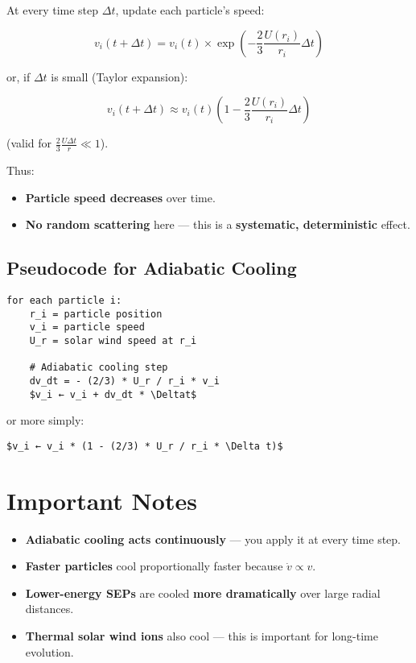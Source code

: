At every time step $\Delta t$, update each particle’s speed:

\begin{equation}
v_i(t + \Delta t) = v_i(t) \times \exp\left( -\frac{2}{3} \frac{U(r_i)}{r_i} \Delta t \right)
\tag{5}
\end{equation}

or, if $\Delta t$ is small (Taylor expansion):

\begin{equation}
\boxed{
v_i(t + \Delta t) \approx v_i(t) \left( 1 - \frac{2}{3} \frac{U(r_i)}{r_i} \Delta t \right)
}
\tag{6}
\end{equation}

(valid for $\frac{2}{3} \frac{U \Delta t}{r} \ll 1$).

Thus:
\begin{itemize}
    \item \textbf{Particle speed decreases} over time.
    \item \textbf{No random scattering} here — this is a \textbf{systematic, deterministic} effect.
\end{itemize}

\subsection*{ Pseudocode for Adiabatic Cooling}

\begin{verbatim}
for each particle i:
    r_i = particle position
    v_i = particle speed
    U_r = solar wind speed at r_i

    # Adiabatic cooling step
    dv_dt = - (2/3) * U_r / r_i * v_i
    $v_i ← v_i + dv_dt * \Deltat$
\end{verbatim}

or more simply:

\begin{verbatim}
$v_i ← v_i * (1 - (2/3) * U_r / r_i * \Delta t)$
\end{verbatim}

\hrulefill

\section*{\texorpdfstring{ \textbf{Important Notes}}{}}

\begin{itemize}
    \item \textbf{Adiabatic cooling acts continuously} — you apply it at every time step.
    \item \textbf{Faster particles} cool proportionally faster because $\dot{v} \propto v$.
    \item \textbf{Lower-energy SEPs} are cooled \textbf{more dramatically} over large radial distances.
    \item \textbf{Thermal solar wind ions} also cool — this is important for long-time evolution.
\end{itemize}

